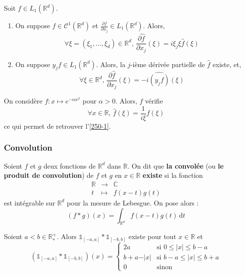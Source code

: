  \begin{proposition}
    Soit $f \in L_1(\mathbb{R}^d)$.
    \begin{enumerate}[label=(\roman*)]
      \item On suppose $f \in \mathcal{C}^1(\mathbb{R}^d)$ et $\frac{\partial f}{\partial x_j} \in L_1(\mathbb{R}^d)$. Alors,
      \[ \forall \xi = (\xi_1, \dots, \xi_d) \in \mathbb{R}^d, \, \widehat{\frac{\partial f}{\partial x_j}}(\xi) = i \xi_j \xi \widehat{f}(\xi) \]
      \item On suppose $y_j f \in L_1(\mathbb{R}^d)$. Alors, la $j$-ième dérivée partielle de $\widehat{f}$ existe, et,
      \[ \forall \xi \in \mathbb{R}^d, \, \frac{\partial \widehat{f}}{\partial x_j}(\xi) = -i \widehat{(y_j f)}(\xi) \]
    \end{enumerate}
  \end{proposition}


  \begin{application}
    On considère $f : x \mapsto e^{- \alpha x^2}$ pour $\alpha > 0$. Alors, $f$ vérifie
    \[ \forall x \in \mathbb{R}, \, \widehat{f}(\xi) = \frac{1}{i \xi} f(\xi) \]
    ce qui permet de retrouver l'\cref{250-1}.
  \end{application}

  \subsubsection{Convolution}


  \begin{definition}
    Soient $f$ et $g$ deux fonctions de $\mathbb{R}^d$ dans $\mathbb{R}$. On dit que \textbf{la convolée} (ou \textbf{le produit de convolution}) de $f$ et $g$ en $x \in \mathbb{R}$ \textbf{existe} si la fonction
    \[
    \begin{array}{ccc}
      \mathbb{R} &\rightarrow& \mathbb{C} \\
      t &\mapsto& f(x-t)g(t)
    \end{array}
    \]
    est intégrable sur $\mathbb{R}^d$ pour la mesure de Lebesgue. On pose alors :
    \[ (f * g)(x) = \int_{\mathbb{R}^d} f(x-t)g(t) \, \mathrm{d}t \]
  \end{definition}

  \begin{example}
    Soient $a < b \in \mathbb{R}^+_*$. Alors $\mathbb{1}_{[-a, a]} * \mathbb{1}_{[-b,b]}$ existe pour tout $x \in \mathbb{R}$ et
    \[ \left( \mathbb{1}_{[-a, a]} * \mathbb{1}_{[-b,b]} \right)(x) =
    \begin{cases}
      2a &\text{si } 0 \leq \vert x \vert \leq b-a \\
      b+a-\vert x \vert &\text{si } b-a \leq \vert x \vert \leq b+a \\
      0 &\text{sinon}
    \end{cases}
    \]
  \end{example}

